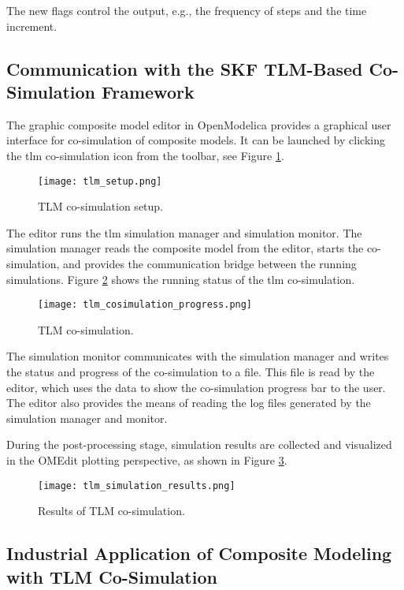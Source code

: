 The new flags control the output, e.g., the frequency of
steps and the time increment. 

\subsection{Communication with the SKF TLM-Based Co-Simulation Framework}
\label{sec:tlmskf}

The graphic composite model editor in OpenModelica
provides a graphical user interface for co-simulation of
composite models. It can be launched by clicking the
\acrshort{tlm} co-simulation icon from the toolbar, see
Figure \ref{fig:tlmsetup}.

\begin{figure}
	\texttt{[image: tlm\_setup.png]}
	\caption{TLM co-simulation setup.}
	\label{fig:tlmsetup}
\end{figure}

The editor runs the \acrshort{tlm} simulation manager and simulation monitor. The simulation manager reads the
composite model from the editor, starts the co-simulation, and provides the communication bridge
between the running simulations. Figure \ref{fig:tlmcosimulationprogress} shows the running status of the \acrshort{tlm} co-simulation.

\begin{figure}
	\texttt{[image: tlm\_cosimulation\_progress.png]}
	\caption{TLM co-simulation.}
	\label{fig:tlmcosimulationprogress}
\end{figure}

The simulation monitor communicates with the simulation manager and writes the status and progress of the co-simulation to a file. This file is read by the editor, which uses the data to show the co-simulation progress bar to the user. The editor also provides the means of reading the log files generated by the simulation manager and monitor.

During the post-processing stage, simulation results are collected and visualized in the OMEdit 
plotting perspective, as shown in Figure \ref{fig:tlmsimulationresults}.
 
\begin{figure}
	\texttt{[image: tlm\_simulation\_results.png]}
	\caption{Results of TLM co-simulation.}
	\label{fig:tlmsimulationresults}
\end{figure}


\subsection{Industrial Application of Composite Modeling with TLM Co-Simulation}
\label{sec:tlmapplication}

